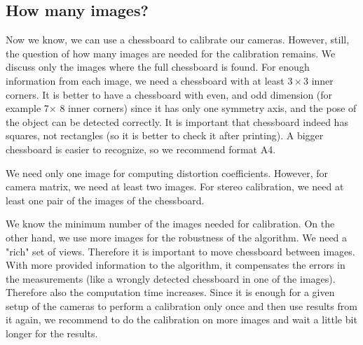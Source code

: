 \subsection{How many images?} Now we know, we can use a chessboard to calibrate
our cameras. However, still, the question of how many images are needed for the
calibration remains. We discuss only the images where the full chessboard is
found. For enough information from each image, we need a chessboard with at
least $3\times3$ inner corners. It is better to have a chessboard with even,
and odd dimension (for example 7$\times$ 8 inner corners) since it has only one
symmetry axis, and the pose of the object can be detected correctly. It is
important that chessboard indeed has squares, not rectangles (so it is better
to check it after printing). A bigger chessboard is easier to recognize, so we
recommend format A4.

We need only one image for computing distortion coefficients. However, for
camera matrix, we need at least two images. For stereo calibration, we need at
least one pair of the images of the chessboard.

We know the minimum number of the images needed for calibration. On the other
hand, we use more images for the robustness of the algorithm. We need a "rich"
set of views. Therefore it is important to move chessboard between images. With
more provided information to the algorithm, it compensates the errors in the
measurements (like a wrongly detected chessboard in one of the images).
Therefore also the computation time increases. Since it is enough for a given
setup of the cameras to perform a calibration only once and then use results
from it again, we recommend to do the calibration on more images and wait a
little bit longer for the results. 


